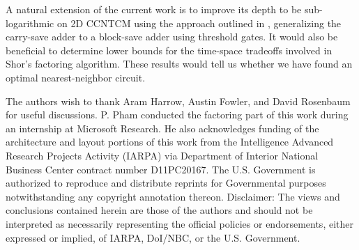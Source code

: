 \documentclass[twoside]{article}
\begin{document}

A natural extension of the current work is to improve its
depth to be sub-logarithmic on 2D CCNTCM using the approach outlined in
\cite{Hoyer2002,Siu1993}, generalizing the carry-save adder to
a block-save adder using threshold gates. It would also be
beneficial to determine lower bounds for the
time-space tradeoffs involved in Shor's factoring algorithm.
These results would tell us whether we have found an
optimal nearest-neighbor circuit.

\noindent
The authors wish to thank Aram Harrow, Austin Fowler, and David Rosenbaum for
useful discussions.
P. Pham conducted the factoring part of this work during
an internship at Microsoft Research.
He also acknowledges funding of the architecture and layout portions
of this work from
the Intelligence Advanced Research Projects Activity
(IARPA) via Department of Interior National Business Center contract
number D11PC20167. The U.S. Government is authorized to reproduce and
distribute reprints for Governmental purposes notwithstanding any
copyright annotation thereon. Disclaimer: The views and conclusions
contained herein are those of the authors and should not be
interpreted as necessarily representing the official policies or
endorsements, either expressed or implied, of IARPA, DoI/NBC, or the
U.S. Government.

\noindent




\end{document}
